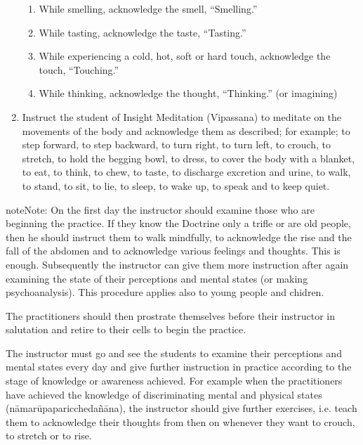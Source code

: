 \documentclass[a5paper,10pt,english]{book}
\begin{document}
\begin{enumerate}
\begin{enumerate}
\item {} 
\sphinxAtStartPar
While smelling, acknowledge the smell, “Smelling.”

\item {} 
\sphinxAtStartPar
While tasting, acknowledge the taste, “Tasting.”

\item {} 
\sphinxAtStartPar
While experiencing a cold, hot, soft or hard touch, acknowledge the touch, “Touching.”

\item {} 
\sphinxAtStartPar
While thinking, acknowledge the thought, “Thinking.” (or imagining)

\end{enumerate}

\item {} 
\sphinxAtStartPar
Instruct the student of Insight Meditation (Vipassana) to meditate on the movements of the body and acknowledge them as described; for example; to step forward, to step backward, to turn right, to turn left, to crouch, to stretch, to hold the begging bowl, to dress, to cover the body with a blanket, to eat, to think, to chew, to taste, to discharge excretion and urine, to walk, to stand, to sit, to lie, to sleep, to wake up, to speak and to keep quiet.

\end{enumerate}

\begin{sphinxadmonition}{note}{Note:}
\sphinxAtStartPar
On the first day the instructor should examine those who are beginning the practice. If they know the Doctrine only a trifle or are old people, then he should instruct them to walk mindfully, to acknowledge the rise and the fall of the abdomen and to acknowledge various feelings and thoughts. This is enough. Subsequently the instructor can give them more instruction after again examining the state of their perceptions and mental states (or making psycho\sphinxhyphen{}analysis). This procedure applies also to young people and chidren.
\end{sphinxadmonition}

\sphinxAtStartPar
The practitioners should then prostrate themselves before their instructor in salutation and retire to their cells to begin the practice.

\sphinxAtStartPar
The instructor must go and see the students to examine their perceptions and mental states every day and give further instruction in practice according to the stage of knowledge or awareness achieved. For example when the practitioners have achieved the knowledge of discriminating mental and physical states (nāmarūpaparicchedañāna), the instructor should give further exercises, i.e. teach them to acknowledge their thoughts from then on whenever they want to crouch, to stretch or to rise.
\end{document}
